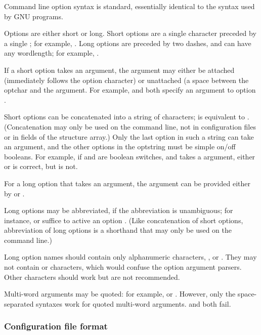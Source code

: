 Command line option syntax is standard, essentially identical to the
syntax used by GNU programs.

Options are either short or long. Short options are a single character
preceded by a single \ccode{-}; for example, . Long options
are preceded by two dashes, and can have any wordlength; for example,
.

If a short option takes an argument, the argument may either be
attached (immediately follows the option character) or unattached (a
space between the optchar and the argument. For example, 
and  both specify an argument  to option
.

Short options can be concatenated into a string of characters;
 is equivalent to . (Concatenation may
only be used on the command line, not in configuration files or in
fields of the  structure array.) Only the last
option in such a string can take an argument, and the other options in
the optstring must be simple on/off booleans. For example, if
 and  are boolean switches, and  takes a
 argument, either  or 
is correct, but  is not.

For a long option that takes an argument, the argument can be provided
either by  or .

Long options may be abbreviated, if the abbreviation is unambiguous;
for instance,  or  suffice to active an
option . (Like concatenation of short options,
abbreviation of long options is a shorthand that may only be used on
the command line.)

Long option names should contain only alphanumeric characters,
\ccode{-}, or \ccode{\_}. They may not contain \ccode{=} or \ccode{,}
characters, which would confuse the option argument parsers. Other
characters should work but are not recommended.

Multi-word arguments may be quoted: for example,  or . However, only the space-separated
syntaxes work for quoted multi-word arguments.  and  both fail.

   \subsubsection{Configuration file format}


